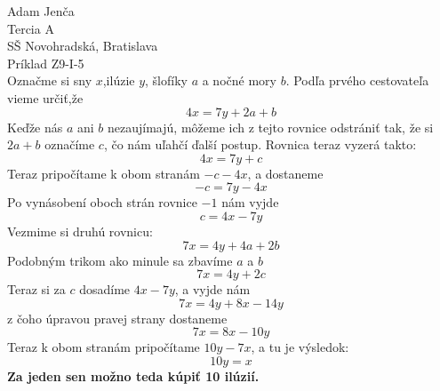 \documentclass{article}
\begin{document}
\large
\noindent
Adam Jenča\\
Tercia A\\
SŠ Novohradská, Bratislava\\
Príklad Z9-I-5\\
\vskip 10mm \noindent
Označme si sny $x$,ilúzie $y$, šlofíky $a$ a nočné mory $b$.
Podľa prvého cestovateľa vieme určiť,že 
$$
4x = 7y + 2a + b
$$
Keďže nás $a$ ani $b$ nezaujímajú, môžeme ich z tejto rovnice odstrániť tak, že si $2a+b$ označíme $c$, čo nám uľahčí ďalší postup.
Rovnica teraz vyzerá takto:
$$
4x = 7y + c
$$
Teraz pripočítame k obom stranám $-c-4x$, a dostaneme
$$
-c = 7y - 4x
$$
Po vynásobení oboch strán rovnice $-1$ nám vyjde
$$
c = 4x - 7y
$$
Vezmime si druhú rovnicu:
$$
7x = 4y + 4a + 2b
$$
Podobným trikom ako minule sa zbavíme $a$ a $b$
$$
7x = 4y + 2c
$$
Teraz si za $c$ dosadíme $4x-7y$, a vyjde nám
$$
7x = 4y + 8x - 14y
$$
z čoho úpravou pravej strany dostaneme
$$
7x = 8x - 10y
$$
Teraz k obom stranám pripočítame $10y - 7x$, a tu je výsledok:
$$
10y = x
$$
\textbf{Za jeden sen možno teda kúpiť 10 ilúzií.}
\end{document}
